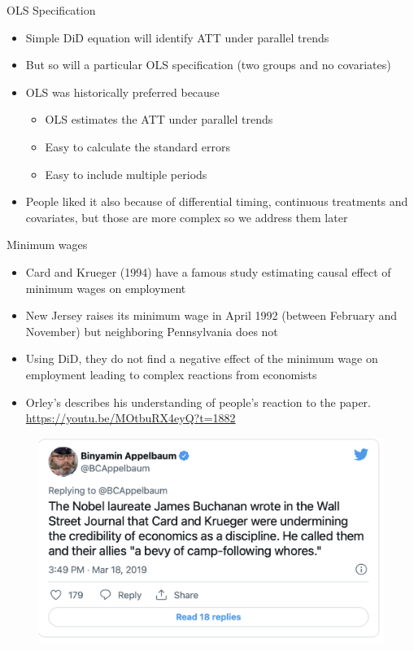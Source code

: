 \documentclass{beamer}
\begin{document}
\begin{frame}{OLS Specification}
	
	\begin{itemize}
	\item Simple DiD equation will identify ATT under parallel trends
	\item But so will a particular OLS specification (two groups and no covariates)
	\item OLS was historically preferred because
		\begin{itemize}
		\item OLS estimates the ATT under parallel trends
		\item Easy to calculate the standard errors
		\item Easy to include multiple periods
		\end{itemize}
	\item People liked it also because of differential timing, continuous treatments and covariates, but those are more complex so we address them later
	\end{itemize}
\end{frame}

\begin{frame}{Minimum wages}

\begin{itemize}
\item Card and Krueger (1994) have a famous study estimating causal effect of minimum wages on employment
\item  New Jersey raises its minimum wage in April 1992 (between February and November) but neighboring Pennsylvania does not
\item Using DiD, they do not find a negative effect of the minimum wage on employment leading to complex reactions from economists
\item Orley's describes his understanding of people's reaction to the paper.  \\ \url{https://youtu.be/MOtbuRX4eyQ?t=1882}
\end{itemize}

\end{frame}

\begin{frame}
	\begin{figure}
	\includegraphics[scale=0.5]{./lecture_includes/minwage_whore}
	\end{figure}
\end{frame}
\end{document}
